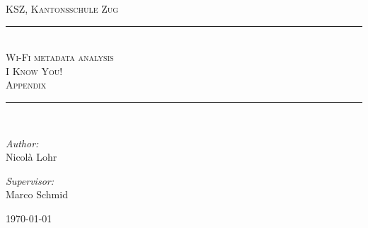 
\newcommand{\HRule}{\rule{\linewidth}{0.5mm}}

\begin{center}


\textsc{\Large  KSZ, Kantonsschule Zug}\\[0.8cm]

\vfill

\HRule \\[1.8cm]
\textsc{\Large  Wi-Fi metadata analysis}\\[0.8cm]
\textsc{ \huge  I Know You!}\\[0.4cm]
\textsc{Appendix}\\[1.4cm]

\HRule \\[1.5cm]

\begin{minipage}[t]{0.38\textwidth}
\begin{flushleft} \large
\emph{Author:}\\
Nicolà Lohr \\ 


\end{flushleft}
\end{minipage}
\begin{minipage}[t]{0.6\textwidth}
\begin{flushright} \large
\emph{Supervisor:}\\
Marco Schmid
\end{flushright}
\end{minipage}

\vfill

{\large \today}

\end{center}
\thispagestyle{empty}
\newpage